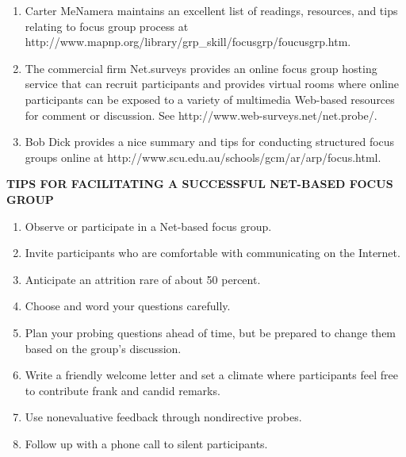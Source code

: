 \begin{enumerate}
\item  Carter MeNamera maintains an excellent list of readings, resources, and tips relating to focus group process at http://www.mapnp.org/library/grp\_skill/focusgrp/foucusgrp.htm.

\item  The commercial firm Net.surveys provides an online focus group hosting service that can recruit participants and provides virtual rooms where online participants can be exposed to a variety of multimedia Web-based resources for comment or discussion. See http://www.web-surveys.net/net.probe/.

\item  Bob Dick provides a nice summary and tips for conducting structured focus groups online at http://www.scu.edu.au/schools/gcm/ar/arp/focus.html.
\end{enumerate}

\noindent 

\noindent \textbf{TIPS FOR FACILITATING A SUCCESSFUL NET-BASED FOCUS GROUP}

\begin{enumerate}
\item \textbf{ }Observe or participate in a Net-based focus group.

\item  Invite participants who are comfortable with communicating on the Internet.

\item  Anticipate an attrition rare of about 50 percent.

\item  Choose and word your questions carefully.

\item  Plan your probing questions ahead of time, but be prepared to change them based on the group's discussion.

\item  Write a friendly welcome letter and set a climate where participants feel free to contribute frank and candid remarks.

\item  Use nonevaluative feedback through nondirective probes.

\item  Follow up with a phone call to silent participants.
\end{enumerate}

\noindent 

\noindent 

